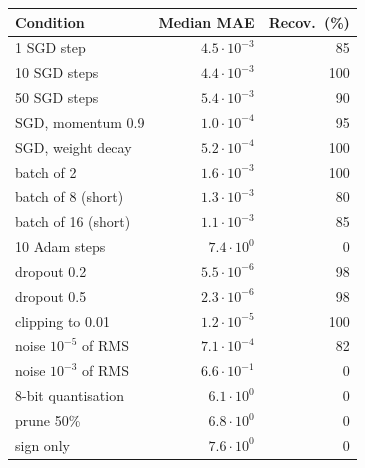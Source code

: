 \begin{tabular}{@{}lrr@{}}
\toprule
Condition & Median MAE & Recov.\ (\%)\\
\midrule
1 SGD step & $4.5\cdot10^{-3}$ & 85\\
10 SGD steps & $4.4\cdot10^{-3}$ & 100\\
50 SGD steps & $5.4\cdot10^{-3}$ & 90\\
SGD, momentum 0.9 & $1.0\cdot10^{-4}$ & 95\\
SGD, weight decay & $5.2\cdot10^{-4}$ & 100\\
batch of 2 & $1.6\cdot10^{-3}$ & 100\\
batch of 8 (short) & $1.3\cdot10^{-3}$ & 80\\
batch of 16 (short) & $1.1\cdot10^{-3}$ & 85\\
10 Adam steps & $7.4\cdot10^{0}$ & 0\\
\midrule
dropout 0.2 & $5.5\cdot10^{-6}$ & 98\\
dropout 0.5 & $2.3\cdot10^{-6}$ & 98\\
clipping to 0.01 & $1.2\cdot10^{-5}$ & 100\\
noise $10^{-5}$ of RMS & $7.1\cdot10^{-4}$ & 82\\
noise $10^{-3}$ of RMS & $6.6\cdot10^{-1}$ & 0\\
8-bit quantisation & $6.1\cdot10^{0}$ & 0\\
prune 50\% & $6.8\cdot10^{0}$ & 0\\
sign only & $7.6\cdot10^{0}$ & 0\\
\bottomrule
\end{tabular}
